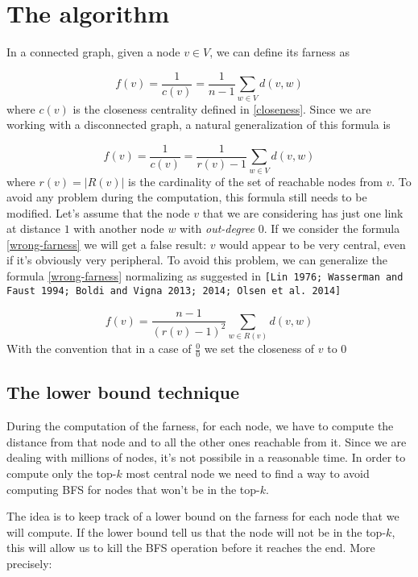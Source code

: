 \section{The algorithm}

In a connected graph, given a node $v \in V$, we can define its farness as

\begin{equation}
    f(v) = \frac{1}{c(v)} = \frac{1}{n-1} \displaystyle \sum_{w \in V} d(v,w)
\end{equation}
where $c(v)$ is the closeness centrality defined in \eqref{closeness}. Since we are working with a disconnected graph, a natural generalization of this formula is

\begin{equation}\label{wrong-farness}
    f(v) = \frac{1}{c(v)} = \frac{1}{r(v)-1} \displaystyle \sum_{w \in V} d(v,w)
\end{equation}
where $r(v) = |R(v)|$ is the cardinality of the set of reachable nodes from $v$. To avoid any problem during the computation, this formula still needs to be modified. Let's assume that the node $v$ that we are considering has just one link at distance $1$ with another node $w$ with \emph{out-degree} 0. If we consider the formula \eqref{wrong-farness} we will get a false result: $v$ would appear to be very central, even if it's obviously very peripheral. To avoid this problem, we can generalize the formula \eqref{wrong-farness} normalizing as suggested in \texttt{[Lin 1976; Wasserman and Faust 1994; Boldi and Vigna 2013; 2014; Olsen et al. 2014]}

\begin{equation}\label{farness}
    f(v) = \frac{n-1}{(r(v)-1)^2} \sum_{w \in R(v)} d(v,w)
\end{equation}
With the convention that in a case of $\frac{0}{0}$ we set the closeness of $v$ to 0

\subsection{The lower bound technique}
During the computation of the farness, for each node, we have to compute the distance from that node and to all the other ones reachable from it. Since we are dealing with millions of nodes, it's not possibile in a reasonable time. In order to compute only the top-$k$ most central node we need to find a way to avoid computing BFS for nodes that won't be in the top-$k$. \s

\noindent The idea is to keep track of a lower bound on the farness for each node that we will compute. If the lower bound tell us that the node will not be in the top-$k$, this will allow us to kill the BFS operation before it reaches the end. More precisely:

